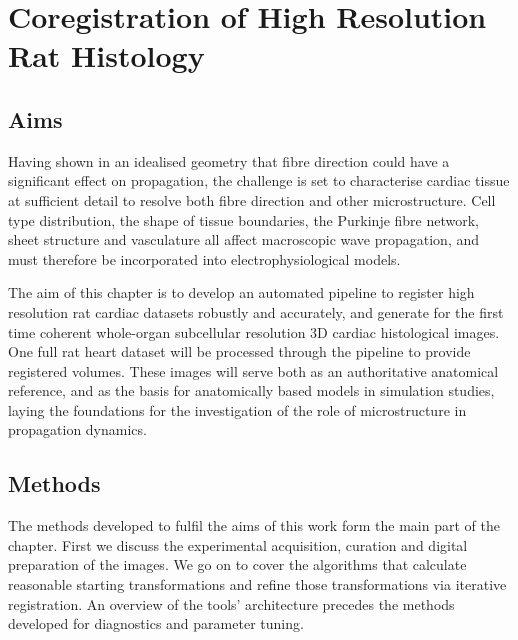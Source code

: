 \chapter{Coregistration of High Resolution Rat Histology} %
\label{cha:coregistration_of_high_resolution_rat_histology}
\dblspace
\begin{quote}{\em }\end{quote}

\section{Aims} %
\label{sec:aims}

  Having shown in an idealised geometry that fibre direction could have a significant effect on propagation, the challenge is set to characterise cardiac tissue at sufficient detail to resolve both fibre direction and other microstructure. Cell type distribution, the shape of tissue boundaries, the Purkinje fibre network, sheet structure and vasculature all affect macroscopic wave propagation, and must therefore be incorporated into electrophysiological models.
	
  The aim of this chapter is to develop an automated pipeline to register high resolution rat cardiac datasets robustly and accurately, and generate for the first time coherent whole-organ subcellular resolution 3D cardiac histological images. One full rat heart dataset will be processed through the pipeline to provide registered volumes. These images will serve both as an authoritative anatomical reference, and as the basis for anatomically based models in simulation studies, laying the foundations for the investigation of the role of microstructure in propagation dynamics.
	

\section{Methods} %
\label{sec:methods}
	The methods developed to fulfil the aims of this work form the main part of the chapter. First we discuss the experimental acquisition, curation and digital preparation of the images. We go on to cover the algorithms that calculate reasonable starting transformations and refine those transformations via iterative registration. An overview of the tools' architecture precedes the methods developed for diagnostics and parameter tuning.
	
